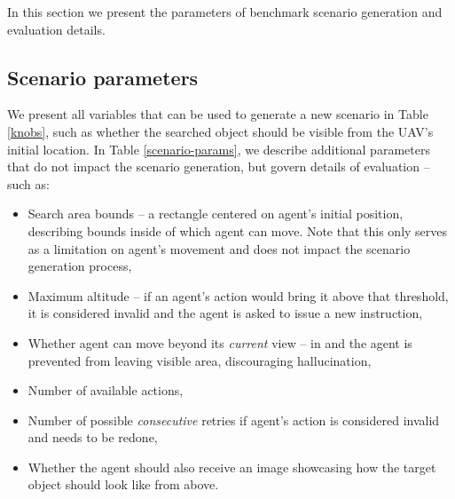In this section we present the parameters of benchmark scenario generation and evaluation details.
\subsection{Scenario parameters}



\label{sec:genparams}

We present all variables that can be used to generate a new scenario in Table \ref{knobs}, such as whether the searched object should be visible from the UAV's initial location. In Table \ref{scenario-params}, we describe additional parameters that do not impact the scenario generation, but govern details of evaluation -- such as: 
\begin{itemize}
    \item Search area bounds -- a rectangle centered on agent's initial position, describing bounds inside of which agent can move. Note that this only serves as a limitation on agent's movement and does not impact the scenario generation process,
    \item Maximum altitude -- if an agent's action would bring it above that threshold, it is considered invalid and the agent is asked to issue a new instruction,
    \item Whether agent can move beyond its \textit{current} view -- in \challenge{} and \anomalychallenge{} the agent is prevented from leaving visible area, discouraging hallucination,
    \item Number of available actions,
    \item Number of possible \textit{consecutive} retries if agent's action is considered invalid and needs to be redone,
    \item Whether the agent should also receive an image showcasing how the target object should look like from above.
\end{itemize}



